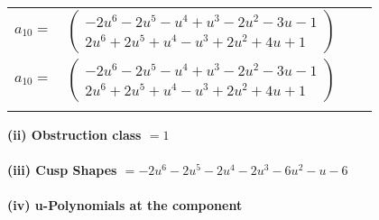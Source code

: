 \documentclass[1p]{elsarticle_modified}
\theoremstyle{definition}
\begin{document}
\begin{tabular}{m{7pt} m{180pt} m{7pt} m{180pt} }
\flushright $a_{10}=$&$\begin{pmatrix}-2 u^6-2 u^5- u^4+u^3-2 u^2-3 u-1\\2 u^6+2 u^5+u^4- u^3+2 u^2+4 u+1\end{pmatrix}$\\ \flushright $a_{10}=$&$\begin{pmatrix}-2 u^6-2 u^5- u^4+u^3-2 u^2-3 u-1\\2 u^6+2 u^5+u^4- u^3+2 u^2+4 u+1\end{pmatrix}$\\&\end{tabular}
\flushleft \textbf{(ii) Obstruction class $= 1$}\\~\\
\flushleft \textbf{(iii) Cusp Shapes $= -2 u^6-2 u^5-2 u^4-2 u^3-6 u^2- u-6$}\\~\\
\newpage\renewcommand{\arraystretch}{1}
\flushleft \textbf{(iv) u-Polynomials at the component}\newline \\
\end{document}
